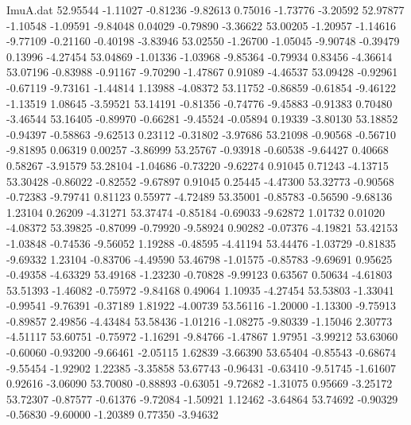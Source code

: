 \begin{filecontents}{ImuA.dat}
  52.95544   -1.11027   -0.81236   -9.82613    0.75016   -1.73776   -3.20592
  52.97877   -1.10548   -1.09591   -9.84048    0.04029   -0.79890   -3.36622
  53.00205   -1.20957   -1.14616   -9.77109   -0.21160   -0.40198   -3.83946
  53.02550   -1.26700   -1.05045   -9.90748   -0.39479    0.13996   -4.27454
  53.04869   -1.01336   -1.03968   -9.85364   -0.79934    0.83456   -4.36614
  53.07196   -0.83988   -0.91167   -9.70290   -1.47867    0.91089   -4.46537
  53.09428   -0.92961   -0.67119   -9.73161   -1.44814    1.13988   -4.08372
  53.11752   -0.86859   -0.61854   -9.46122   -1.13519    1.08645   -3.59521
  53.14191   -0.81356   -0.74776   -9.45883   -0.91383    0.70480   -3.46544
  53.16405   -0.89970   -0.66281   -9.45524   -0.05894    0.19339   -3.80130
  53.18852   -0.94397   -0.58863   -9.62513    0.23112   -0.31802   -3.97686
  53.21098   -0.90568   -0.56710   -9.81895    0.06319    0.00257   -3.86999
  53.25767   -0.93918   -0.60538   -9.64427    0.40668    0.58267   -3.91579
  53.28104   -1.04686   -0.73220   -9.62274    0.91045    0.71243   -4.13715
  53.30428   -0.86022   -0.82552   -9.67897    0.91045    0.25445   -4.47300
  53.32773   -0.90568   -0.72383   -9.79741    0.81123    0.55977   -4.72489
  53.35001   -0.85783   -0.56590   -9.68136    1.23104    0.26209   -4.31271
  53.37474   -0.85184   -0.69033   -9.62872    1.01732    0.01020   -4.08372
  53.39825   -0.87099   -0.79920   -9.58924    0.90282   -0.07376   -4.19821
  53.42153   -1.03848   -0.74536   -9.56052    1.19288   -0.48595   -4.41194
  53.44476   -1.03729   -0.81835   -9.69332    1.23104   -0.83706   -4.49590
  53.46798   -1.01575   -0.85783   -9.69691    0.95625   -0.49358   -4.63329
  53.49168   -1.23230   -0.70828   -9.99123    0.63567    0.50634   -4.61803
  53.51393   -1.46082   -0.75972   -9.84168    0.49064    1.10935   -4.27454
  53.53803   -1.33041   -0.99541   -9.76391   -0.37189    1.81922   -4.00739
  53.56116   -1.20000   -1.13300   -9.75913   -0.89857    2.49856   -4.43484
  53.58436   -1.01216   -1.08275   -9.80339   -1.15046    2.30773   -4.51117
  53.60751   -0.75972   -1.16291   -9.84766   -1.47867    1.97951   -3.99212
  53.63060   -0.60060   -0.93200   -9.66461   -2.05115    1.62839   -3.66390
  53.65404   -0.85543   -0.68674   -9.55454   -1.92902    1.22385   -3.35858
  53.67743   -0.96431   -0.63410   -9.51745   -1.61607    0.92616   -3.06090
  53.70080   -0.88893   -0.63051   -9.72682   -1.31075    0.95669   -3.25172
  53.72307   -0.87577   -0.61376   -9.72084   -1.50921    1.12462   -3.64864
  53.74692   -0.90329   -0.56830   -9.60000   -1.20389    0.77350   -3.94632

\end{filecontents}
